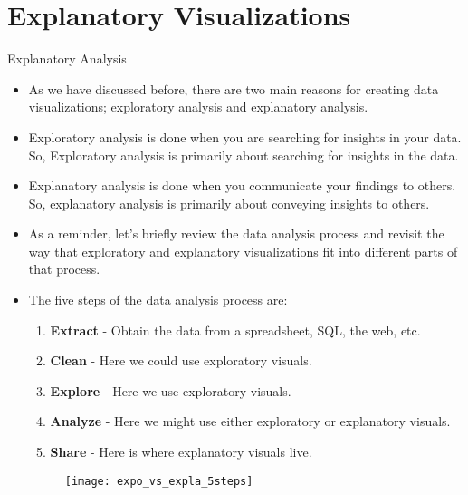 \documentclass[12pt]{beamer}
\begin{document}
\section{Explanatory Visualizations}   
    \begin{frame}{Explanatory Analysis}
    	\begin{itemize}
    		\item As we have discussed before, there are two main reasons for creating data visualizations; exploratory analysis and explanatory analysis.
    		\item Exploratory analysis is done when you are searching for insights in your data. So, Exploratory analysis is primarily about searching for insights in the data.
    		\item Explanatory analysis is done when you communicate your findings to others. So, explanatory analysis is primarily about conveying insights to others.
    		\item As a reminder, let's briefly review the data analysis process and revisit the way that exploratory and explanatory visualizations fit into different parts of that process.
    	\end{itemize}
    \end{frame}
    \begin{frame}{}
    	\begin{itemize}
    		\item The five steps of the data analysis process are: 
    		\begin{enumerate}
    			\item \textbf{Extract} - Obtain the data from a spreadsheet, SQL, the web, etc.
    			\item \textbf{Clean} - Here we could use exploratory visuals.
    			\item \textbf{Explore} - Here we use exploratory visuals.
    			\item \textbf{Analyze} - Here we might use either exploratory or explanatory visuals.
    			\item \textbf{Share} - Here is where explanatory visuals live.
    		\end{enumerate}
    	    \begin{figure}
    	    	\centering
    	    	\texttt{[image: expo\_vs\_expla\_5steps]}
    	    \end{figure}
    	\end{itemize}
    \end{frame}
\end{document}
